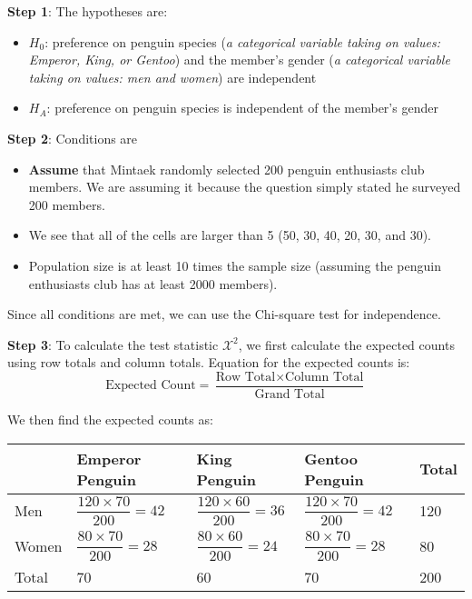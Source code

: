 \documentclass[12pt]{article}
\begin{document}
\noindent \textbf{Step 1}: The hypotheses are:
\vspace{-10pt}
\begin{itemize}\itemsep-0.2em
	\item $H_0$: preference on penguin species (\textit{a categorical variable taking on values: Emperor, King, or Gentoo}) and the member's gender (\textit{a categorical variable taking on values: men and women}) are independent
	\item $H_A$: preference on penguin species is independent of the member's gender
\end{itemize}
\vspace{-10 pt}

\noindent \textbf{Step 2}: Conditions are
\vspace{-10pt}
\begin{itemize}\itemsep-0.2em
	\item \textbf{Assume} that Mintaek randomly selected 200 penguin enthusiasts club members. We are assuming it because the question simply stated he surveyed 200 members.
	\item We see that all of the cells are larger than 5 (50, 30, 40, 20, 30, and 30).
	\item Population size is at least 10 times the sample size (assuming the penguin enthusiasts club has at least 2000 members).
\end{itemize}
\vspace{-10 pt}

Since all conditions are met, we can use the Chi-square test for independence.

\noindent \textbf{Step 3}: To calculate the test statistic $\mathcal{X}^2$, we first calculate the expected counts using row totals and column totals. Equation for the expected counts is: \[ \text{Expected Count} = \dfrac{\text{Row Total} \times \text{Column Total}}{\text{Grand Total}} \]

We then find the expected counts as:

\begin{table}[h]
	\centering
	\def\arraystretch{2.5}
	\begin{tabular}{l|lll|l}
		& Emperor Penguin & King Penguin & Gentoo Penguin & Total \\ \hline
		Men & $\dfrac{120 \times 70}{200} = 42$ & $\dfrac{120 \times 60}{200} = 36$ & $\dfrac{120 \times 70}{200} = 42$ & 120 \\
		Women & $\dfrac{80 \times 70}{200} = 28$ & $\dfrac{80 \times 60}{200} = 24$ & $\dfrac{80 \times 70}{200} = 28$ & 80 \\ \hline
		Total & 70 & 60 & 70 & 200
	\end{tabular}
\end{table}
\end{document}
